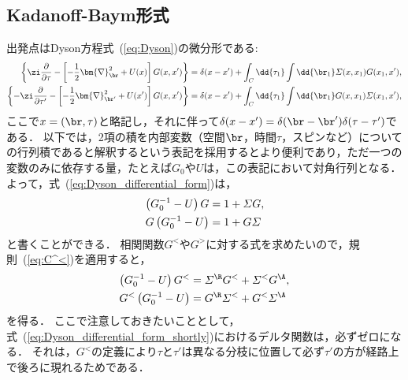 \documentclass[a4paper,10pt]{jsarticle}
\begin{document}
\subsection{\label{sec:5.2}Kadanoff-Baym形式}
出発点はDyson方程式~(\ref{eq:Dyson})の微分形である:
\begin{align}
\left\{
	\zi \frac{\partial}{\partial \tau} - \left[ - \frac{1}{2} \bm{\nabla}^2_{\br} + U (x) \right] G (x, x')
\right\}
	& = \delta (x - x')
		+ \int_{C} \dd{\tau_1} \int \dd{\br_1} \varSigma (x, x_1) G (x_1, x') 
, \notag \\
\left\{
	- \zi \frac{\partial}{\partial \tau'} - \left[ - \frac{1}{2} \bm{\nabla}^2_{\br'} + U (x') \right] G (x, x')
\right\}
	& = \delta (x - x')
		+ \int_{C} \dd{\tau_1} \int \dd{\br_1} G (x, x_1) \varSigma (x_1, x')
\label{eq:Dyson_differential_form}
,\end{align}
ここで$x = (\br, \tau)$と略記し，それに伴って$\delta (x - x') = \delta (\br - \br') \delta (\tau - \tau')$である．
以下では，2項の積を内部変数（空間$\br$，時間$\tau$，スピンなど）についての行列積であると解釈するという表記を採用するとより便利であり，ただ一つの変数のみに依存する量，たとえば$G_0$や$U$は，この表記において対角行列となる．
よって，式~(\ref{eq:Dyson_differential_form})は，
\begin{align}
\left( G_0^{-1} - U \right) G
	& = 1 + \varSigma G
, \notag \\
G \left( G_0^{-1} - U \right)
	& = 1 + G \varSigma
\label{eq:Dyson_differential_form_shortly}
\end{align}
と書くことができる．
相関関数$G^{<}$や$G^{>}$に対する式を求めたいので，規則~(\ref{eq:C^<})を適用すると，
\begin{align}
\left( G_0^{-1} - U \right) G^{<}
	& = \varSigma^{\R} G^{<} + \varSigma^{<} G^{\A}
, \notag \\
G^{<} \left( G_0^{-1} - U \right)
	& = G^{\R} \varSigma^{<} + G^{<} \varSigma^{\A}
\label{eq:5.3}
\end{align}
を得る．
ここで注意しておきたいこととして，式~(\ref{eq:Dyson_differential_form_shortly})におけるデルタ関数は，必ずゼロになる．
それは，$G^{<}$の定義により$\tau$と$\tau'$は異なる分枝に位置して必ず$\tau'$の方が経路上で後ろに現れるためである．
\end{document}
